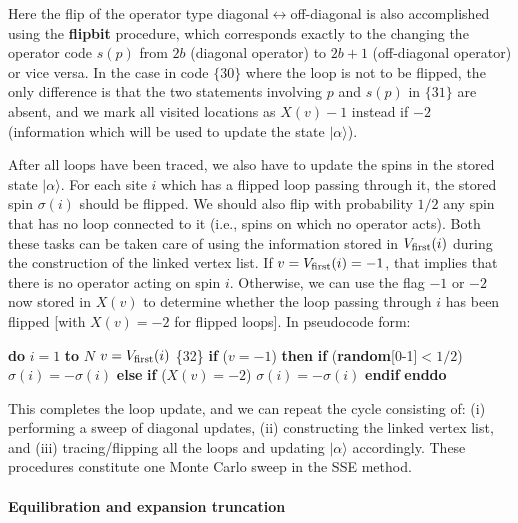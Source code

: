 \documentclass[draft,numberedheadings]{aipproc}
\newcommand{\code}{\null\vskip-2mm\noindent}
\newcommand{\br}{\hfill\break}
\newcommand{\cia}{\null\hskip5mm}
\newcommand{\cib}{\null\hskip10mm}
\newcommand{\cic}{\null\hskip15mm}
\begin{document}
\noindent
Here the flip of the operator type diagonal$\leftrightarrow$off-diagonal is also accomplished using the {\bf flipbit} procedure, which corresponds
exactly to the changing the operator code $s(p)$ from $2b$ (diagonal operator) to $2b+1$ (off-diagonal operator) or vice versa. In the case in code
$\{30\}$ where the loop is not to be flipped, the only difference is that the two statements involving $p$ and $s(p)$ in $\{31\}$ are absent, and we mark 
all visited locations as $X(v)-1$ instead if $-2$ (information which will be used to update the state $|\alpha\rangle$).

After all loops have been traced, we also have to update the spins in the stored state $|\alpha\rangle$. For each site $i$ which has a flipped loop passing 
through it, the stored spin $\sigma(i)$ should be flipped. We should also flip with probability $1/2$ any spin that has no loop connected to it (i.e., spins
on which no operator acts). Both these tasks can be taken care of using the information stored in $V_{\rm first}(i)$ during the construction of the linked vertex 
list. If $v=V_{\rm first}(i)=-1$, that implies that there is no operator acting on spin $i$. Otherwise, we can use the flag $-1$ or $-2$ now stored in $X(v)$ to 
determine whether the loop passing through $i$ has been flipped [with $X(v)=-2$ for flipped loops]. In pseudocode form:

{\code
\cia       {\bf do} $i=1$ {\bf to} $N$ \br
\cib            $v=V_{\rm first}(i)$           \hfill   \{32\} \break 
\cib            {\bf if} ($v=-1$) {\bf then} \br 
\cic                {\bf if} ({\bf random}[0-1]$<1/2$) $\sigma(i)=-\sigma(i)$ \br             
\cib            {\bf else} \br
\cic                {\bf if} ($X(v)=-2$) $\sigma(i)=-\sigma(i)$ \br             
\cib            {\bf endif} \br
\cia        {\bf enddo}
\code}

\noindent
This completes the loop update, and we can repeat the cycle consisting of: (i) performing a sweep of diagonal updates, (ii) constructing the linked 
vertex list, and (iii) tracing/flipping all the loops and updating $|\alpha\rangle$ accordingly. These procedures constitute one Monte Carlo sweep 
in the SSE method.

\paragraph{Equilibration and expansion truncation}
\end{document}
